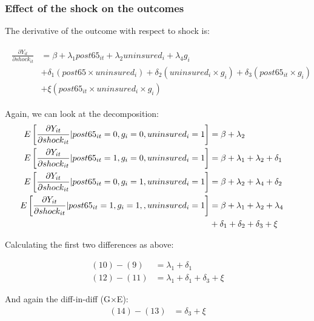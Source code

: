 \documentclass[10pt,compress,xcolor=dvipsnames,aspectratio=169]{beamer}    %
\newcommand{\1}[1]{\mathrm{1\hspace*{-2.5pt}l}[#1]}	%
\begin{document}
\begin{frame}
\frametitle{Effect of the shock on the outcomes} \label{frame:shockmath2}
The derivative of the outcome with respect to shock is:
\hyperlink{fig:maincoeffplot}{}

\begin{footnotesize}
\begin{align}
\begin{aligned}
	\frac{\partial Y_{it}}{\partial shock_{it}}&=\beta+\lambda_1post65_{it}+\lambda_2uninsured_{i}+\lambda_4g_i\\
	&+\delta_1(post65 \times uninsured_i)+\delta_2(uninsured_i \times g_i)+\delta_3(post65_{it} \times g_i)\\
	&+\xi(post65_{it} \times uninsured_i \times g_i)
\end{aligned}
\end{align}

Again, we can look at the decomposition:
\begin{align}
\phantom{E\left[ \frac{\partial Y_{it}}{\partial shock_{it}}| post65_{it}=1, g_i=1,uninsured_i=1\right]}
&\begin{aligned}
\mathllap{E\left[ \frac{\partial Y_{it}}{\partial shock_{it}}| post65_{it}=0, g_i=0,uninsured_i=1\right]} &=\beta+\lambda_2
\end{aligned}\\
&\begin{aligned}
\mathllap{E\left[ \frac{\partial Y_{it}}{\partial shock_{it}}| post65_{it}=1, g_i=0,uninsured_i=1\right]} &=\beta+\lambda_1+\lambda_2+\delta_1
\end{aligned}\\
&\begin{aligned}
\mathllap{E\left[ \frac{\partial Y_{it}}{\partial shock_{it}}| post65_{it}=0, g_i=1,uninsured_i=1\right]} &=\beta+\lambda_2+\lambda_4+\delta_2
\end{aligned}\\
&\begin{aligned}
\mathllap{E\left[ \frac{\partial Y_{it}}{\partial shock_{it}}| post65_{it}=1, g_i=1,,uninsured_i=1\right]} &=\beta+\lambda_1+\lambda_2+\lambda_4\\
&+\delta_1+\delta_2+\delta_3+\xi
\end{aligned}
\end{align}

Calculating the first two differences as above:

\begin{align}
(10)-(9)&=\lambda_1+\delta_1\\
(12)-(11)&=\lambda_1+\delta_1+\delta_3+\xi
\end{align}

And again the diff-in-diff (G$\times$E):
\begin{align}
(14)-(13)&=\delta_3+\xi
\end{align}
\end{footnotesize}

\end{frame}
\end{document}

